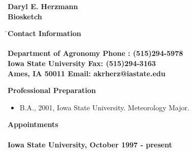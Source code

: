 \renewcommand{\oddsidemargin}{0pt}
\renewcommand{\evensidemargin}{0pt}
\renewcommand{\topmargin}{0pt}
\renewcommand{\headheight}{0pt}
\renewcommand{\headsep}{0pt}
\renewcommand{\textwidth}{468pt}
\renewcommand{\textheight}{260mm}
\hoffset=-60pt
\voffset=-36pt
%
\settowidth{\parindent}{}
\setlength{\parskip}{2mm}
%
\newcommand{\dvd}{\rule{30mm}{0.2mm}}
\newcommand{\beq}{\begin{equation}}
\newcommand{\beqn}{\begin{eqnarray}}
\newcommand{\eeq}{\end{equation}}
\newcommand{\eeqn}{\end{eqnarray}}
\newcommand{\lsf}{\large \sf}
%
\newcommand{\qbar}{\mbox{$\overline{q}$}}
%

%
\vspace*{0.25in}
\begin{center}
\LARGE \bf Daryl E. Herzmann\\
\Large \bf Biosketch\\
\end{center}
\begin{tabbing}
\= \Large \bf Contact Information \hspace*{2.5in} \= \\
\> \> \\
\> \lsf Department of Agronomy \> \lsf Phone : (515)294-5978\\
\> \lsf Iowa State University \> \lsf Fax: (515)294-3163\\
\> \lsf Ames, IA 50011 \> \lsf Email: akrherz@iastate.edu \\
\end{tabbing}
\Large \bf Professional Preparation
\normalsize \sf
\begin{itemize}
\item B.A., 2001, Iowa State University.  Meteorology Major.
\end{itemize}
\Large \bf Appointments\\ \\
\normalsize \bf Iowa State University, October 1997 - present
\normalsize \sf
